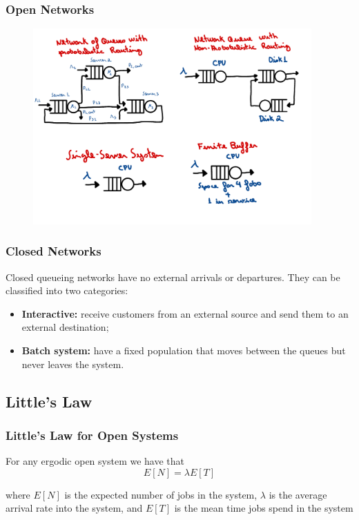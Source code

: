 \begin{frame}
    \frametitle{Open Networks}
    \begin{figure}
        \centering
        \includegraphics[width=0.95\textwidth]{slides/figures/open_networks_example.pdf}
    \end{figure}
\end{frame}




\begin{frame}
    \frametitle{Closed Networks}

    Closed queueing networks have no external arrivals or departures. 
    They can be classified into two categories:

    \begin{itemize}
       \item \textbf{Interactive:} receive customers from an external
       source and send them to an external destination;

       \item \textbf{Batch system:} have a fixed population that moves between 
       the queues but never leaves the system.
    \end{itemize}

\end{frame}


\subsection{Little's Law}


\begin{frame}
    \frametitle{Little's Law for Open Systems}

    \begin{definition}
        For any ergodic open system we have that
        $$E[N] = \lambda E[T]$$

        where $E[N]$ is the expected number of jobs in the system, $\lambda$
        is the average arrival rate into the system, and $E[T]$ is the 
        mean time jobs spend in the system
    \end{definition}

\end{frame}



